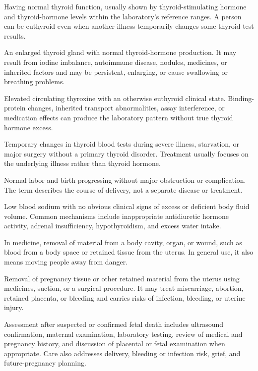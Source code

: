  Having normal thyroid function, usually shown by thyroid-stimulating hormone and thyroid-hormone levels within the laboratory’s reference ranges. A person can be euthyroid even when another illness temporarily changes some thyroid test results.

 An enlarged thyroid gland with normal thyroid-hormone production. It may result from iodine imbalance, autoimmune disease, nodules, medicines, or inherited factors and may be persistent, enlarging, or cause swallowing or breathing problems.

 Elevated circulating thyroxine with an otherwise euthyroid clinical state. Binding-protein changes, inherited transport abnormalities, assay interference, or medication effects can produce the laboratory pattern without true thyroid hormone excess.

 Temporary changes in thyroid blood tests during severe illness, starvation, or major surgery without a primary thyroid disorder. Treatment usually focuses on the underlying illness rather than thyroid hormone.

 Normal labor and birth progressing without major obstruction or complication. The term describes the course of delivery, not a separate disease or treatment.

 Low blood sodium with no obvious clinical signs of excess or deficient body fluid volume. Common mechanisms include inappropriate antidiuretic hormone activity, adrenal insufficiency, hypothyroidism, and excess water intake.

 In medicine, removal of material from a body cavity, organ, or wound, such as blood from a body space or retained tissue from the uterus. In general use, it also means moving people away from danger.

 Removal of pregnancy tissue or other retained material from the uterus using medicines, suction, or a surgical procedure. It may treat miscarriage, abortion, retained placenta, or bleeding and carries risks of infection, bleeding, or uterine injury.

 Assessment after suspected or confirmed fetal death includes ultrasound confirmation, maternal examination, laboratory testing, review of medical and pregnancy history, and discussion of placental or fetal examination when appropriate. Care also addresses delivery, bleeding or infection risk, grief, and future-pregnancy planning.

